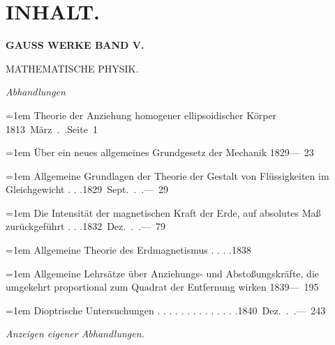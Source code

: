 \section*{INHALT.}
\begin{center}\bfseries GAUSS WERKE BAND V.\par MATHEMATISCHE PHYSIK.\end{center}
\par\nopagebreak[4]\smallskip\noindent\makebox[\linewidth][c]{\rule{.075\linewidth}{.35pt}}\par
\begingroup\fontsize{9}{11}\selectfont\raggedright
\par{}\medskip\noindent\textit{Abhandlungen}\par\smallskip
\noindent\hangindent=1em Theorie der Anziehung homogener ellipsoidischer Körper \unskip\hspace{1em plus 1fill}\mbox{1813 März . .\quad Seite 1}\par\smallskip
\noindent\hangindent=1em Über ein neues allgemeines Grundgesetz der Mechanik \unskip\hspace{1em plus 1fill}\mbox{1829\quad — 23}\par\smallskip
\noindent\hangindent=1em Allgemeine Grundlagen der Theorie der Gestalt von Flüssigkeiten im Gleichgewicht . . .\unskip\hspace{1em plus 1fill}\mbox{1829 Sept. . .\quad — 29}\par\smallskip
\noindent\hangindent=1em Die Intensität der magnetischen Kraft der Erde, auf absolutes Maß zurückgeführt . . .\unskip\hspace{1em plus 1fill}\mbox{1832 Dez. . .\quad — 79}\par\smallskip
\noindent\hangindent=1em Allgemeine Theorie des Erdmagnetismus . . . .\unskip\hspace{1em plus 1fill}\mbox{1838}\par\smallskip
\noindent\hangindent=1em Allgemeine Lehrsätze über Anziehungs- und Abstoßungskräfte, die umgekehrt proportional zum Quadrat der Entfernung wirken \unskip\hspace{1em plus 1fill}\mbox{1839\quad — 195}\par\smallskip
\noindent\hangindent=1em Dioptrische Untersuchungen . . . . . . . . . . . . . .\unskip\hspace{1em plus 1fill}\mbox{1840 Dez. . .\quad — 243}\par\smallskip
\par{}\medskip\noindent\textit{Anzeigen eigener Abhandlungen.}\par\smallskip
